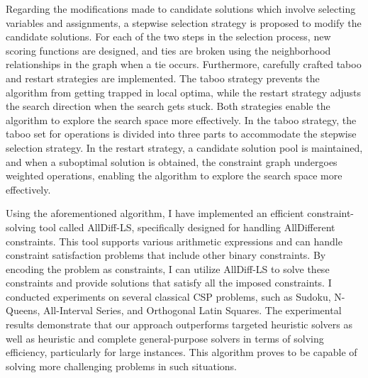 Regarding the modifications made to candidate solutions which involve selecting variables and assignments, a stepwise selection strategy is proposed to modify the candidate solutions. For each of the two steps in the selection process, new scoring functions are designed, and ties are broken using the neighborhood relationships in the graph when a tie occurs. Furthermore, carefully crafted taboo and restart strategies are implemented. The taboo strategy prevents the algorithm from getting trapped in local optima, while the restart strategy adjusts the search direction when the search gets stuck. Both strategies enable the algorithm to explore the search space more effectively. In the taboo strategy, the taboo set for operations is divided into three parts to accommodate the stepwise selection strategy. In the restart strategy, a candidate solution pool is maintained, and when a suboptimal solution is obtained, the constraint graph undergoes weighted operations, enabling the algorithm to explore the search space more effectively.

Using the aforementioned algorithm, I have implemented an efficient constraint-solving tool called AllDiff-LS, specifically designed for handling AllDifferent constraints. This tool supports various arithmetic expressions and can handle constraint satisfaction problems that include other binary constraints. By encoding the problem as constraints, I can utilize AllDiff-LS to solve these constraints and provide solutions that satisfy all the imposed constraints. I conducted experiments on several classical CSP problems, such as Sudoku, N-Queens, All-Interval Series, and Orthogonal Latin Squares. The experimental results demonstrate that our approach outperforms targeted heuristic solvers as well as heuristic and complete general-purpose solvers in terms of solving efficiency, particularly for large instances. This algorithm proves to be capable of solving more challenging problems in such situations.

